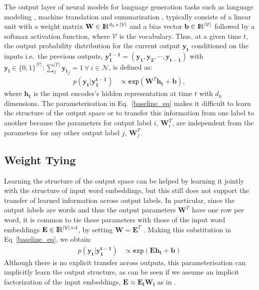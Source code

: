 \documentclass{article}
\begin{document}
The output layer of neural models for language generation tasks such as language modeling \cite{bengio2003,mikolov2012context,merity2017regularizing},  machine translation \cite{Bahdanau15,luong15,TACL1081} and summarization \cite{rush15,paulus2018a}, typically consists of a linear unit with a weight matrix $\mathbf{W}\in \rm I\!R^{d_h \times |\mathcal{V}|}$ and a bias vector  $\mathbf{b}\in \rm I\!R^{|\mathcal{V}|}$ followed by a softmax activation function,  where $\mathcal{V}$ is the vocabulary.  
Thus, at a given time $t$, the output probability distribution for the current output  $\mathbf{y_t}$ conditioned on the inputs i.e.\ the previous outputs, $\mathbf{y_1^{t-1}} = (\mathbf{y_1}, \mathbf{y_2}, \cdots, \mathbf{y_{t-1}})$ with $\mathbf{y_i}\in\{0,1\}^{|\mathcal{V}|}:  \sum^{|\mathcal{V}|}_j \mathbf{y_{i}}_j = 1 \ \forall \ i \in \mathcal{N} $, is defined as:
\begin{align}
 p(\mathbf{y_t}|\mathbf{y_1^{t-1}}) & \propto  \texttt{exp}(\mathbf{W}^T\mathbf{{h}_t} + \mathbf{b}) ,
          \label{baseline_eq}
\end{align}
where $\mathbf{{h}_t}$ is the input encoder's hidden representation at time $t$ with $d_h$ dimensions. The parameterisation in Eq.~\ref{baseline_eq} makes it difficult to learn the structure of the output space or to transfer this information from one label to another because the parameters for output label $i$,  $\mathbf{W}^T_i$, are independent from the parameters for any other output label $j$, $\mathbf{W}^T_j$.

\subsection{Weight Tying} Learning the structure of the output space can be helped by learning it jointly with the structure of input word embeddings, but this still does not support the transfer of learned information across output labels.  In particular, since the output labels are words and thus the output parameters $\mathbf{W}^T$ have one row per word, it is common to tie these parameters with those of the input word embeddings $\mathbf{E} \in \rm I\!R^{|\mathcal{V}| \times d}$, by setting $\mathbf{W} = \mathbf{E}^T$ \cite{inan2016tying,press17}. 
Making this substitution in Eq~\ref{baseline_eq}, we obtain: 
\begin{align}
 p(\mathbf{y_t}|{\mathbf{y_1^{t-1}}}) 
          & \propto  \texttt{exp}(\mathbf{E} \mathbf{{h}_t} + \mathbf{b})  \label{eq:tied} 
\end{align} 
Although there is no explicit transfer across outputs, this parameterisation can implicitly learn the output structure, as can be seen if we assume an implicit factorization of the input embeddings, $\mathbf{E}\approx \mathbf{E_{l}} \mathbf{W_l}$ as in \cite{mikolov13}.
\end{document}
